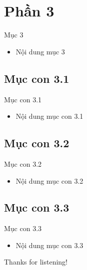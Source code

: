 \documentclass{beamer}
\begin{document}
\section{Phần 3}
\begin{frame}{Mục 3}
\begin{itemize}
\item Nội dung mục 3
\end{itemize}
\end{frame}

\subsection{Mục con 3.1}
\begin{frame}{Mục con 3.1}
\begin{itemize}
\item Nội dung mục con 3.1
\end{itemize}
\end{frame}

\subsection{Mục con 3.2}
\begin{frame}{Mục con 3.2}
\begin{itemize}
\item Nội dung mục con 3.2
\end{itemize}
\end{frame}

\subsection{Mục con 3.3}
\begin{frame}{Mục con 3.3}
\begin{itemize}
\item Nội dung mục con 3.3
\end{itemize}
\end{frame}

\begin{frame}{}
\centering
\Huge{Thanks for listening!}
\end{frame}
\end{document}
